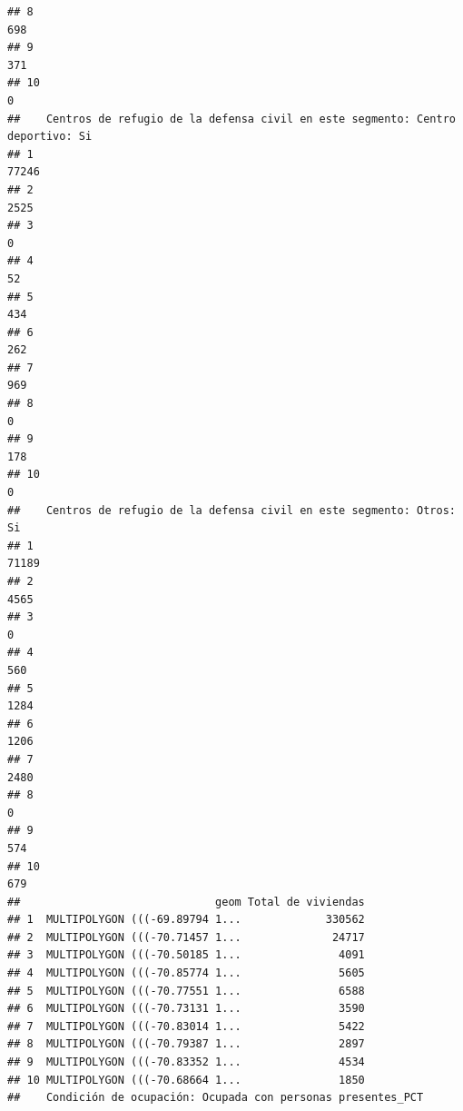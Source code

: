 \documentclass[11pt,]{article}
\begin{document}
\begin{verbatim}
## 8                                                                         698
## 9                                                                         371
## 10                                                                          0
##    Centros de refugio de la defensa civil en este segmento: Centro deportivo: Si
## 1                                                                          77246
## 2                                                                           2525
## 3                                                                              0
## 4                                                                             52
## 5                                                                            434
## 6                                                                            262
## 7                                                                            969
## 8                                                                              0
## 9                                                                            178
## 10                                                                             0
##    Centros de refugio de la defensa civil en este segmento: Otros: Si
## 1                                                               71189
## 2                                                                4565
## 3                                                                   0
## 4                                                                 560
## 5                                                                1284
## 6                                                                1206
## 7                                                                2480
## 8                                                                   0
## 9                                                                 574
## 10                                                                679
##                              geom Total de viviendas
## 1  MULTIPOLYGON (((-69.89794 1...             330562
## 2  MULTIPOLYGON (((-70.71457 1...              24717
## 3  MULTIPOLYGON (((-70.50185 1...               4091
## 4  MULTIPOLYGON (((-70.85774 1...               5605
## 5  MULTIPOLYGON (((-70.77551 1...               6588
## 6  MULTIPOLYGON (((-70.73131 1...               3590
## 7  MULTIPOLYGON (((-70.83014 1...               5422
## 8  MULTIPOLYGON (((-70.79387 1...               2897
## 9  MULTIPOLYGON (((-70.83352 1...               4534
## 10 MULTIPOLYGON (((-70.68664 1...               1850
##    Condición de ocupación: Ocupada con personas presentes_PCT

\end{verbatim}
\end{document}

